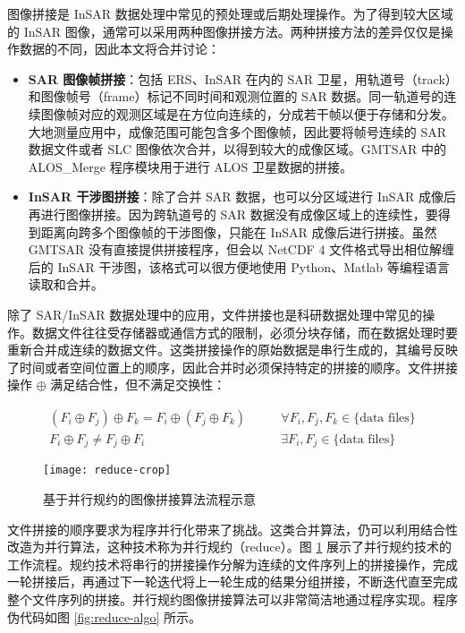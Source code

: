 图像拼接是 InSAR 数据处理中常见的预处理或后期处理操作。为了得到较大区域的 InSAR 图像，通常可以采用两种图像拼接方法。两种拼接方法的差异仅仅是操作数据的不同，因此本文将合并讨论：

\begin{itemize}
    \item \textbf{SAR 图像帧拼接}：包括 ERS、InSAR 在内的 SAR 卫星，用轨道号（track）和图像帧号（frame）标记不同时间和观测位置的 SAR 数据。同一轨道号的连续图像帧对应的观测区域是在方位向连续的，分成若干帧以便于存储和分发。大地测量应用中，成像范围可能包含多个图像帧，因此要将帧号连续的 SAR 数据文件或者 SLC 图像依次合并，以得到较大的成像区域。GMTSAR 中的 ALOS\_Merge 程序模块用于进行 ALOS 卫星数据的拼接。
    \item \textbf{InSAR 干涉图拼接}：除了合并 SAR 数据，也可以分区域进行 InSAR 成像后再进行图像拼接。因为跨轨道号的 SAR 数据没有成像区域上的连续性，要得到距离向跨多个图像帧的干涉图像，只能在 InSAR 成像后进行拼接。虽然 GMTSAR 没有直接提供拼接程序，但会以 NetCDF 4 文件格式导出相位解缠后的 InSAR 干涉图，该格式可以很方便地使用 Python、Matlab 等编程语言读取和合并。
\end{itemize}

除了 SAR/InSAR 数据处理中的应用，文件拼接也是科研数据处理中常见的操作。数据文件往往受存储器或通信方式的限制，必须分块存储，而在数据处理时要重新合并成连续的数据文件。这类拼接操作的原始数据是串行生成的，其编号反映了时间或者空间位置上的顺序，因此合并时必须保持特定的拼接的顺序。文件拼接操作 $\oplus$ 满足结合性，但不满足交换性：

\begin{equation}
\begin{split}
    (F_i \oplus F_j) \oplus F_k = F_i \oplus (F_j \oplus F_k) \qquad &\forall F_i, F_j, F_k \in \textrm{\{data files\}} \\
    F_i \oplus F_j \neq F_j \oplus F_i \qquad &\exists F_i, F_j \in \textrm{\{data files\}}
\end{split}
\end{equation}

\begin{figure}[htbp]
\centering
\texttt{[image: reduce-crop]}
\caption{基于并行规约的图像拼接算法流程示意} \label{fig:reduce}
\end{figure}

文件拼接的顺序要求为程序并行化带来了挑战。这类合并算法，仍可以利用结合性改造为并行算法，这种技术称为并行规约（reduce）\cite{chen2002paraalgo}。图 \ref{fig:reduce} 展示了并行规约技术的工作流程。规约技术将串行的拼接操作分解为连续的文件序列上的拼接操作，完成一轮拼接后，再通过下一轮迭代将上一轮生成的结果分组拼接，不断迭代直至完成整个文件序列的拼接。并行规约图像拼接算法可以非常简洁地通过程序实现。程序伪代码如图 \ref{fig:reduce-algo} 所示。

